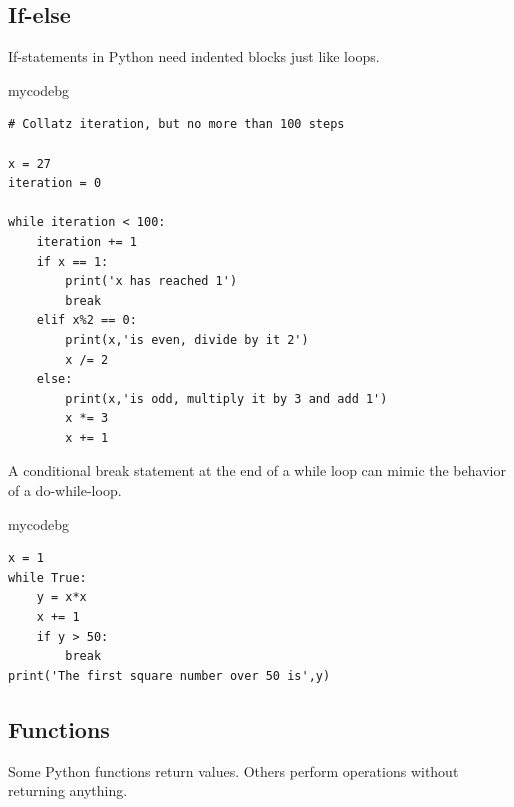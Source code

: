 \subsection{If-else}
If-statements in Python need indented blocks just like loops.
\begin{tsession}{mycodebg}
\begin{verbatim}
# Collatz iteration, but no more than 100 steps

x = 27
iteration = 0

while iteration < 100:
    iteration += 1
    if x == 1:
        print('x has reached 1')
        break
    elif x%2 == 0:
        print(x,'is even, divide by it 2')
        x /= 2
    else:
        print(x,'is odd, multiply it by 3 and add 1')
        x *= 3
        x += 1
\end{verbatim}
\end{tsession}
A conditional break statement at the end of a while loop
can mimic the behavior of a do-while-loop.
\begin{tsession}{mycodebg}
\begin{verbatim}
x = 1
while True:
    y = x*x
    x += 1
    if y > 50:
        break
print('The first square number over 50 is',y)
\end{verbatim}
\end{tsession}
\subsection{Functions}
Some Python functions return values.
Others perform operations without returning anything.

